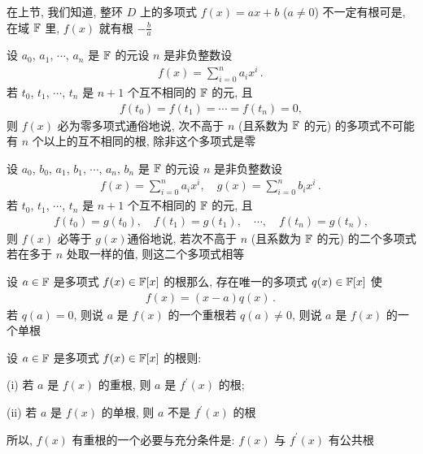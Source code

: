 \begin{remark}
    在上节, 我们知道, 整环 $D$ 上的多项式 $f(x) = ax + b$ ($a \neq 0$) 不一定有根\period 可是, 在域 $\mathbb{F}$ 里, $f(x)$ 就有根 $-\frac{b}{a}$\period
\end{remark}

\begin{proposition}
    设 $a_0$, $a_1$, $\cdots$, $a_n$ 是 $\mathbb{F}$ 的元\period 设 $n$ 是非负整数\period 设
    \begin{align*}
        f(x) = \sum_{i = 0}^n a_i x^i \period
    \end{align*}
    若 $t_0$, $t_1$, $\cdots$, $t_n$ 是 $n+1$ 个互不相同的 $\mathbb{F}$ 的元, 且
    \begin{align*}
        f(t_0) = f(t_1) = \cdots = f(t_n) = 0,
    \end{align*}
    则 $f(x)$ 必为零多项式\period 通俗地说, 次不高于 $n$ (且系数为 $\mathbb{F}$ 的元) 的多项式不可能有 $n$ 个以上的互不相同的根, 除非这个多项式是零\period
\end{proposition}

\begin{proposition}
    设 $a_0$, $b_0$, $a_1$, $b_1$, $\cdots$, $a_n$, $b_n$ 是 $\mathbb{F}$ 的元\period 设 $n$ 是非负整数\period 设
    \begin{align*}
        f(x) = \sum_{i = 0}^n a_i x^i, \quad g(x) = \sum_{i = 0}^n b_i x^i \period
    \end{align*}
    若 $t_0$, $t_1$, $\cdots$, $t_n$ 是 $n+1$ 个互不相同的 $\mathbb{F}$ 的元, 且
    \begin{align*}
        f(t_0) = g(t_0), \quad f(t_1) = g(t_1), \quad \cdots, \quad f(t_n) = g(t_n),
    \end{align*}
    则 $f(x)$ 必等于 $g(x)$\period 通俗地说, 若次不高于 $n$ (且系数为 $\mathbb{F}$ 的元) 的二个多项式若在多于 $n$ 处取一样的值, 则这二个多项式相等\period
\end{proposition}

\begin{definition}
    设 $a \in \mathbb{F}$ 是多项式 $f(x) \in \mathbb{F}[x]$ 的根\period 那么, 存在唯一的多项式 $q(x) \in \mathbb{F}[x]$ 使
    \begin{align*}
        f(x) = (x - a) q(x) \period
    \end{align*}
    若 $q(a) = 0$, 则说 $a$ 是 $f(x)$ 的一个重根\period 若 $q(a) \neq 0$, 则说 $a$ 是 $f(x)$ 的一个单根\period
\end{definition}

\begin{proposition}
    设 $a \in \mathbb{F}$ 是多项式 $f(x) \in \mathbb{F}[x]$ 的根\period 则:

    (i) 若 $a$ 是 $f(x)$ 的重根, 则 $a$ 是 $f^{\prime} (x)$ 的根;

    (ii) 若 $a$ 是 $f(x)$ 的单根, 则 $a$ 不是 $f^{\prime} (x)$ 的根\period

    所以, $f(x)$ 有重根的一个必要与充分条件是: $f(x)$ 与 $f^{\prime} (x)$ 有公共根\period
\end{proposition}

